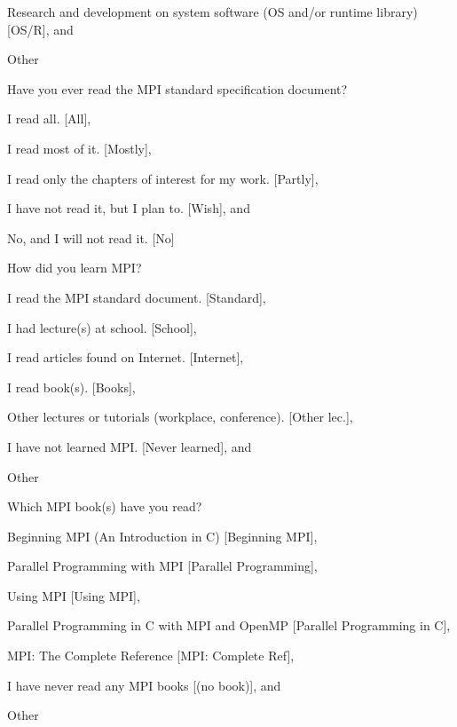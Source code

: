 \documentclass[preprint,5p,times]{elsarticle}
\begin{document}
{{\begin{description}[leftmargin=3mm]
\begin{inparaenum}[{\bf C}1)]
    \item Research and development on system software (OS and/or runtime
      library) [OS/R], and
    \item Other
    \end{inparaenum}
  \item[Q9:] Have you ever read the MPI standard specification document?
    \begin{inparaenum}[{\bf C}1)]
    \item I read all. [All],
    \item I read most of it. [Mostly],
    \item I read only the chapters of interest for my work. [Partly],
    \item I have not read it, but I plan to. [Wish], and
    \item No, and I will not read it. [No]
    \end{inparaenum}
  \item[Q10*:] How did you learn MPI?
    \begin{inparaenum}[{\bf C}1)]
    \item I read the MPI standard document. [Standard],
    \item I had lecture(s) at school. [School],
    \item I read articles found on Internet. [Internet],
    \item I read book(s). [Books],
    \item Other lectures or tutorials (workplace, conference). [Other lec.],
    \item I have not learned MPI. [Never learned], and
    \item Other
    \end{inparaenum}
  \item[Q11*:] Which MPI book(s) have you read?
    \begin{inparaenum}[{\bf C}1)]
    \item Beginning MPI (An Introduction in C) [Beginning MPI],
    \item Parallel Programming with MPI [Parallel Programming],
    \item Using MPI [Using MPI],
    \item Parallel Programming in C with MPI and OpenMP [Parallel
      Programming in C],
    \item MPI: The Complete Reference [MPI: Complete Ref],
    \item I have never read any MPI books [(no book)], and
    \item Other

\end{inparaenum}
\end{description}}}
\end{document}
